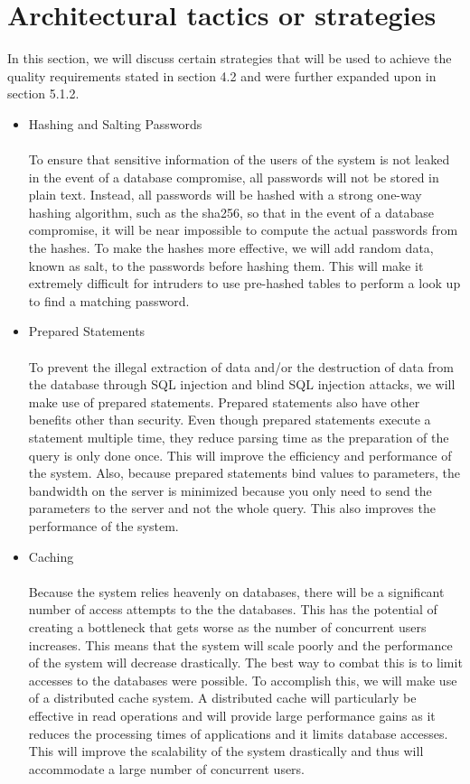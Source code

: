 \documentclass[a4paper]{article}
\begin{document}
\section{Architectural tactics or strategies}
In this section, we will discuss certain strategies that will be used to achieve the quality requirements stated in section 4.2 and were further expanded upon in section 5.1.2.
\begin{itemize}
	\item Hashing and Salting Passwords \\\\
	To ensure that sensitive information of the users of the system is not leaked in the event of a database compromise, all passwords will not be stored in plain text. Instead, all passwords will be hashed with a strong one-way hashing algorithm, such as the sha256, so that in the event of a database compromise, it will be near impossible to compute the actual passwords from the hashes. To make the hashes more effective, we will add random data, known as salt, to the passwords before hashing them. This will make it extremely difficult for intruders to use pre-hashed tables to perform a look up to find a matching password.
	\\
	\item Prepared Statements \\\\
	To prevent the illegal extraction of data and/or the destruction of data from the database through SQL injection and blind SQL injection attacks, we will make use of prepared statements. Prepared statements also have other benefits other than security. Even though prepared statements execute a statement multiple time, they reduce parsing time as the preparation of the query is only done once. This will improve the efficiency and performance of the system. Also, because prepared statements bind values to parameters, the bandwidth on the server is minimized because you only need to send the parameters to the server and not the whole query. This also improves the performance of the system.
	\\
	\item Caching \\\\
	Because the system relies heavenly on databases, there will be a significant number of access attempts to the the databases. This has the potential of creating a bottleneck that gets worse as the number of concurrent users increases. This means that the system will scale poorly and the performance of the system will decrease drastically. The best way to combat this is to limit accesses to the databases were possible. To accomplish this, we will make use of a distributed cache system. A distributed cache will particularly be effective in read operations and will provide large performance gains as it reduces the processing times of applications and it limits database accesses. This will improve the scalability of the system drastically and thus will accommodate a large number of concurrent users. 

\end{itemize}
\end{document}
